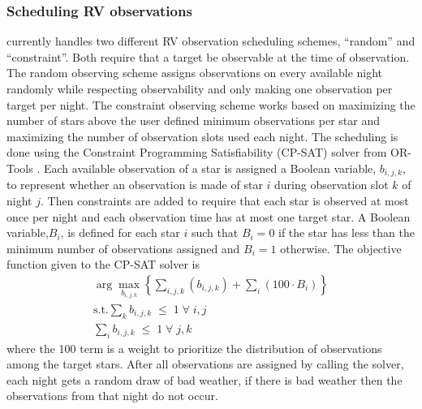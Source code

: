 \subsubsection{Scheduling RV observations}

 currently handles two different RV observation scheduling schemes,
``random'' and ``constraint''. Both require that a target be observable at the time
of observation. The random observing scheme assigns observations on every
available night randomly while respecting observability and only making one
observation per target per night. The constraint observing scheme works based
on maximizing the number of stars above the user defined minimum observations
per star and maximizing the number of observation slots used each night. The
scheduling is done using the Constraint Programming Satisfiability (CP-SAT)
solver from OR-Tools \citep{perronORTools2022}. Each available observation of a
star is assigned a Boolean variable, $b_{i,j,k}$, to represent whether an
observation is made of star $i$ during observation slot $k$ of night $j$. Then
constraints are added to require that each star is observed at most once per
night and each observation time has at most one target star. A Boolean
variable,$B_i$, is defined for each star $i$ such that $B_i = 0$ if the
star has less than the minimum number of observations assigned and $B_i = 1$
otherwise. The objective function given to the CP-SAT solver is
\begin{gather}
  \arg{\max_{b_{i,j,k}}} \left\{ \sum_{i,j,k}\left(
  b_{i,j,k}\right) + \sum_i\left( 100 \cdot B_{i}\right)
  \right\}\\
  \textrm{s.t.}
  \sum_k b_{i,j,k} \; \leq \; 1 \; \forall \; i,j\\
  \sum_i b_{i,j,k} \; \leq \; 1 \; \forall \; j,k
  \label{eq:rv_objective}
\end{gather}
where the 100 term is a weight to prioritize the distribution of
observations among the target stars. After all observations are assigned by
calling the solver, each night gets a random draw of bad weather, if there is
bad weather then the observations from that night do not occur.

